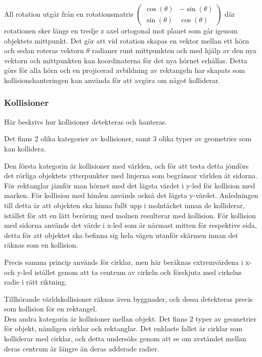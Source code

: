 \documentclass[12pt,a4paper]{article}
\newcounter{subsubsubsection}[subsubsection]
\begin{document}
All rotation utgår från en rotationsmatris 
\begin{math}
	\begin{pmatrix}
	\cos (\theta) & -\sin (\theta) \\
	\sin (\theta) & \cos (\theta)  
	\end{pmatrix}
\end{math}
där rotationen sker längs en tredje z axel ortogonal mot planet som går igenom objektets mittpunkt. Det gör att vid rotation skapas en vektor mellan ett hörn och sedan roteras vektorn $\theta$ radianer runt mittpunkten och med hjälp av den nya vektorn och mittpunkten kan koordinaterna för det nya hörnet erhållas. Detta görs för alla hörn och en projicerad avbildning av rektangeln har skapats som kollisionshanteringen kan använda för att avgöra om något kolliderar. \\


\subsubsection{Kollisioner}
Här beskrivs hur kollisioner detekteras och hanteras.


Det finns 2 olika kategorier av kollisioner, samt 3 olika typer av geometrier som kan kollidera.

Den första kategorin är kollisioner med världen, och för att testa detta jömförs det rörliga objektets ytterpunkter med linjerna som begränsar världen åt sidorna. För rektanglar jämför man hörnet med det lägsta värdet i y-led för kollision med marken. För kollision med himlen används också det lägsta y-värdet. Anledningen till detta är att objekten ska hinna fullt upp i molntäcket innan de kolliderar, istället för att en lätt beröring med molnen resulterar med kollision. För kollision med sidorna används det värde i x-led som är närmast mitten för respektive sida, detta för att objektet ska befinna sig hela vägen utanför skärmen innan det räknas som en kollision.

Precis samma princip används för cirklar, men här beräknas extremvärdena i x- och y-led istället genom att ta centrum av cirkeln och förskjuta med cirkelns radie i rätt riktning.

Tillhörande världskollisioner räknas även byggnader, och dessa detekteras precis som kollision för en rektangel. \\

Den andra kategorin är kollisioner mellan objekt. Det finns 2 typer av geometrier för objekt, nämligen cirklar och rektanglar. Det enklaste fallet är cirklar som kolliderar med cirklar, och detta undersöks genom att se om avståndet mellan deras centrum är längre än deras adderade radier. \\
\end{document}
